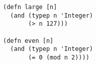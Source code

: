 \begin{lstlisting}[style=reclojureClojure]
(defn large [n]
  (and (typep n 'Integer)
       (> n 127)))

(defn even [n]
  (and (typep n 'Integer)
       (= 0 (mod n 2))))
\end{lstlisting}
